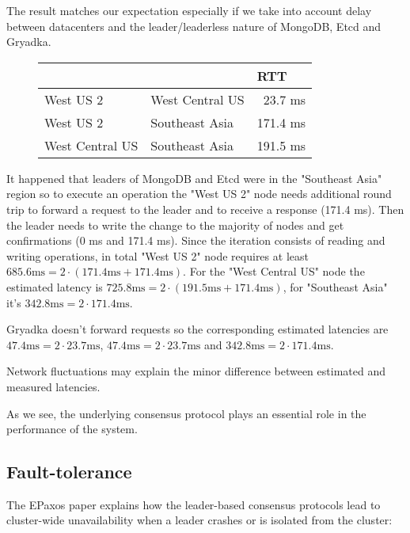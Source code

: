 \documentclass[12pt]{article}
\theoremstyle{definition}
\begin{document}
The result matches our expectation especially if we take into account delay between datacenters and the leader/leaderless nature of MongoDB, Etcd and Gryadka.

\begin{figure}[!h]
  \centering
  \begin{tabular}{llr|}
  \cline{3-3}
  & & \multicolumn{1}{|l|}{RTT} \\
  \hline
  \multicolumn{1}{|l|}{West US 2} & \multicolumn{1}{|l|}{West Central US} & 23.7 ms\\
  \hline
  \multicolumn{1}{|l|}{West US 2} & \multicolumn{1}{|l|}{Southeast Asia} & 171.4 ms\\
  \hline
  \multicolumn{1}{|l|}{West Central US} & \multicolumn{1}{|l|}{Southeast Asia} & 191.5 ms\\
  \hline
  \end{tabular}
\end{figure}

It happened that leaders of MongoDB and Etcd were in the "Southeast Asia" region so to execute an operation the "West US 2" node needs additional round trip to forward a request to the leader and to receive a response (171.4 ms). Then the leader needs to write the change to the majority of nodes and get confirmations (0 ms and 171.4 ms). Since the iteration consists of reading and writing operations, in total "West US 2" node requires at least $685.6 \mbox{ms} = 2 \cdot (171.4 \mbox{ms} + 171.4 \mbox{ms})$. For the "West Central US" node the estimated latency is $725.8 \mbox{ms} = 2 \cdot (191.5 \mbox{ms} + 171.4 \mbox{ms})$, for "Southeast Asia" it's $342.8 \mbox{ms} = 2 \cdot 171.4 \mbox{ms}$.

Gryadka doesn't forward requests so the corresponding estimated latencies are $47.4 \mbox{ms} = 2 \cdot 23.7 \mbox{ms}$, $47.4 \mbox{ms} = 2 \cdot 23.7 \mbox{ms}$ and $342.8 \mbox{ms} = 2 \cdot 171.4 \mbox{ms}$.

Network fluctuations may explain the minor difference between estimated and measured latencies.

As we see, the underlying consensus protocol plays an essential role in the performance of the system.

\subsection{Fault-tolerance}

The EPaxos paper explains how the leader-based consensus protocols lead to cluster-wide unavailability when a leader crashes or is isolated from the cluster:
\end{document}
